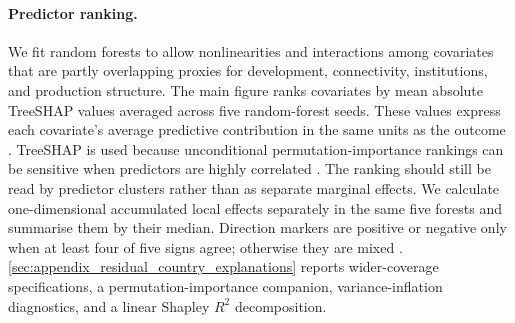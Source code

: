 \documentclass[11pt]{article}
\begin{document}
\paragraph{Predictor ranking.} We fit random forests to allow nonlinearities and interactions among covariates that are partly overlapping proxies for development, connectivity, institutions, and production structure. The main figure ranks covariates by mean absolute TreeSHAP values averaged across five random-forest seeds. These values express each covariate's average predictive contribution in the same units as the outcome \citep{LundbergLee2017SHAP,LundbergEtAl2020TreeSHAP}. TreeSHAP is used because unconditional permutation-importance rankings can be sensitive when predictors are highly correlated \citep{StroblEtAl2008ConditionalImportance}. The ranking should still be read by predictor clusters rather than as separate marginal effects. We calculate one-dimensional accumulated local effects separately in the same five forests and summarise them by their median. Direction markers are positive or negative only when at least four of five signs agree; otherwise they are mixed \citep{ApleyZhu2020ALE}. \ref{sec:appendix_residual_country_explanations} reports wider-coverage specifications, a permutation-importance companion, variance-inflation diagnostics, and a linear Shapley $R^2$ decomposition.



\end{document}
